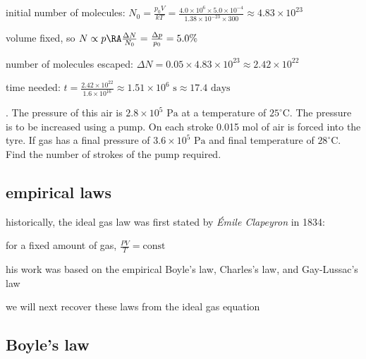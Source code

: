 \sol initial number of molecules: $N_0 = \frac{p_0V}{kT} = \frac{4.0\times10^6\times 5.0\times10^{-4}}{1.38\times10^{-23}\times300}\approx 4.83\times10^{23}$

\eqyskip

volume fixed, so $N \propto p \RA \frac{\Delta N}{N_0} = \frac{\Delta p}{p_0} = 5.0\%$

number of molecules escaped: $\Delta N = 0.05\times4.83\times10^{23} \approx 2.42 \times10^{22}$

time needed: $t = \frac{2.42 \times10^{22}}{1.6 \times 10^{16}} \approx 1.51 \times 10^6 \text{ s} \approx 17.4 \text{ days}$ \eoe

\newpage %


. The pressure of this air is $2.8\times10^5 \text{ Pa}$ at a temperature of $25^\circ$C. The pressure is to be increased using a pump. On each stroke 0.015 mol of air is forced into the tyre. If gas has a final pressure of $3.6\times10^5 \text{ Pa}$ and final temperature of $28^\circ$C. Find the number of strokes of the pump required.


\subsection{empirical laws}

historically, the ideal gas law was first stated by \emph{\'Emile Clapeyron} in 1834:

for a fixed amount of gas, $\boxed{\frac{PV}{T} = \text{const}}$

his work was based on the empirical Boyle's law, Charles's law, and Gay-Lussac's law

we will next recover these laws from the ideal gas equation

\subsection*{Boyle's law}

